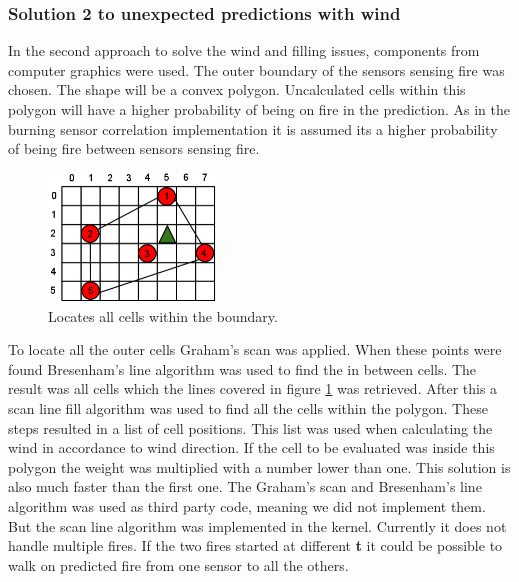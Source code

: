 \subsubsection{Solution 2 to unexpected predictions with wind}
In the second approach to solve the wind and filling issues, components from computer graphics were used. The outer boundary of the sensors sensing fire was chosen. The shape will be a convex polygon. Uncalculated cells within this polygon will have a higher probability of being on fire in the prediction. As in the burning sensor correlation implementation it is assumed its a higher probability of being fire between sensors sensing fire.
\begin{figure}[here]
  \centering
      \includegraphics[width=0.4\textwidth]{solution/graphics/graphical-boundary.png}
  \caption{Locates all cells within the boundary.}
  \label{fig:graphical-boundary}
\end{figure}
To locate all the outer cells Graham's scan \cite{graham} was applied. When these points were found Bresenham's\cite{bresenham} line algorithm was used to find the in between cells. The result was all cells which the lines covered in figure \ref{fig:graphical-boundary} was retrieved. After this a scan line fill algorithm was used to find all the cells within the polygon. These steps resulted in a list of cell positions. This list was used when calculating the wind in accordance to wind direction. If the cell to be evaluated was inside this polygon the weight was multiplied with a number lower than one. This solution is also much faster than the first one. The Graham's scan and Bresenham's line algorithm was used as third party code, meaning we did not implement them. But the scan line algorithm was implemented in the kernel. Currently it does not handle multiple fires. If the two fires started at different \textbf{t} it could be possible to walk on predicted fire from one sensor to all the others.
